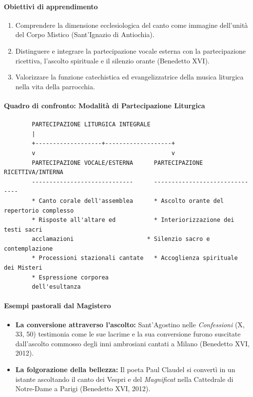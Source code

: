 \documentclass[12pt,a4paper]{article}
\begin{document}
	\paragraph{Obiettivi di apprendimento}\label{obiettivi-di-apprendimento-4}
	
	\begin{enumerate}[label=\arabic*.,leftmargin=*]
		\item Comprendere la dimensione ecclesiologica del canto come immagine dell'unità del Corpo Mistico (Sant'Ignazio di Antiochia).
		\item Distinguere e integrare la partecipazione vocale esterna con la partecipazione ricettiva, l'ascolto spirituale e il silenzio orante (Benedetto XVI).
		\item Valorizzare la funzione catechistica ed evangelizzatrice della musica liturgica nella vita della parrocchia.
	\end{enumerate}
	
	\paragraph{Quadro di confronto: Modalità di Partecipazione Liturgica}\label{quadro-di-confronto-modalita-di-partecipazione-liturgica}
	
	\begin{verbatim}
		PARTECIPAZIONE LITURGICA INTEGRALE
		|
		+-------------------+-------------------+
		v                                       v
		PARTECIPAZIONE VOCALE/ESTERNA      PARTECIPAZIONE RICETTIVA/INTERNA
		-----------------------------      -------------------------------
		* Canto corale dell'assemblea      * Ascolto orante del repertorio complesso
		* Risposte all'altare ed           * Interiorizzazione dei testi sacri
		acclamazioni                     * Silenzio sacro e contemplazione
		* Processioni stazionali cantate   * Accoglienza spirituale dei Misteri
		* Espressione corporea
		dell'esultanza
	\end{verbatim}
	
	\paragraph{Esempi pastorali dal Magistero}\label{esempi-pastorali-dal-magistero}
	
	\begin{itemize}[leftmargin=*]
		\item \textbf{La conversione attraverso l'ascolto:} Sant'Agostino nelle \emph{Confessioni} (X, 33, 50) testimonia come le sue lacrime e la sua conversione furono suscitate dall'ascolto commosso degli inni ambrosiani cantati a Milano (Benedetto XVI, 2012).
		\item \textbf{La folgorazione della bellezza:} Il poeta Paul Claudel si convertì in un istante ascoltando il canto dei Vespri e del \emph{Magnificat} nella Cattedrale di Notre-Dame a Parigi (Benedetto XVI, 2012).
	\end{itemize}
	
\end{document}
